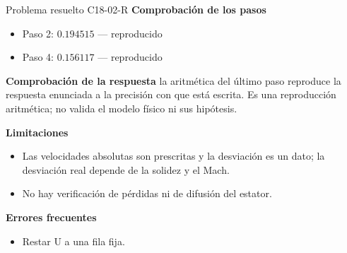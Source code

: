 \documentclass[10pt,openany]{book}
\begin{document}
\begin{studiumworked}{Problema resuelto C18-02-R}
\noindent\textbf{Comprobación de los pasos}
\begin{itemize}
\item Paso 2: $0.194515$ — reproducido
\item Paso 4: $0.156117$ — reproducido
\end{itemize}

\noindent\textbf{Comprobación de la respuesta} la aritmética del último paso reproduce la respuesta enunciada a la precisión con que está escrita. Es una reproducción aritmética; no valida el modelo físico ni sus hipótesis.

\noindent\textbf{Limitaciones}
\begin{itemize}
\item Las velocidades absolutas son prescritas y la desviación es un dato; la desviación real depende de la solidez y el Mach.
\item No hay verificación de pérdidas ni de difusión del estator.
\end{itemize}

\noindent\textbf{Errores frecuentes}
\begin{itemize}
\item Restar U a una fila fija.
\end{itemize}
\end{studiumworked}
\end{document}
